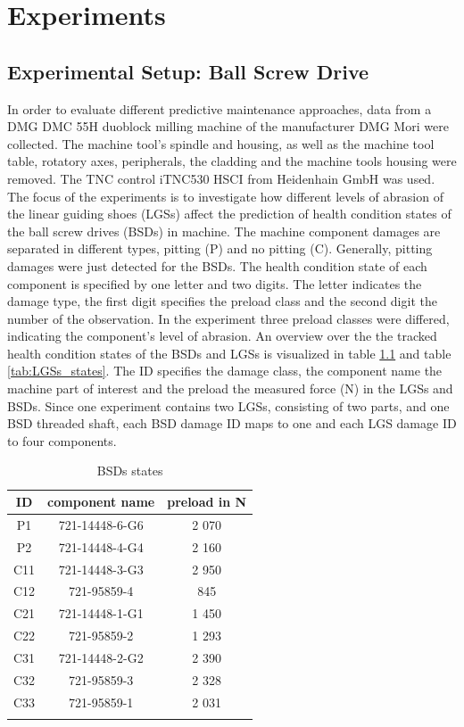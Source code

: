 \chapter{Experiments}\label{chapter:experiments}




\section{Experimental Setup: Ball Screw Drive}
In order to evaluate different predictive maintenance approaches, data from a DMG DMC 55H duoblock milling machine of the manufacturer DMG Mori were collected. The machine tool’s spindle and housing, as well as the machine tool table, rotatory axes, peripherals, the cladding and the machine tools housing were removed. The TNC control iTNC530 HSCI from Heidenhain GmbH was used. The focus of the experiments is to investigate how different levels of abrasion of the linear guiding shoes (LGSs) affect the prediction of health condition states of the ball screw drives (BSDs) in machine. The machine component damages are separated in different types, pitting (P) and no pitting (C). Generally, pitting damages were just detected for the BSDs. The health condition state of each component is specified by one letter and two digits. The letter indicates the damage type, the first digit specifies the preload class and the second digit the number of the observation. In the experiment three preload classes were differed, indicating the component's level of abrasion. An overview over the the tracked health condition states of the BSDs and LGSs is visualized in table \ref {tab:BSDs_states} and table \ref {tab:LGSs_states}. The ID specifies the damage class, the component name the machine part of interest and the preload the measured force (N) in the LGSs and BSDs. Since one experiment contains two LGSs, consisting of two parts, and one BSD threaded shaft, each BSD damage ID maps to one and each LGS damage ID to four components. 


\begin{center}
\begin{longtable}{||c c c||} 
 \hline
 ID & component name & preload in N \\ [0.5ex] 
 \hline
 P1 & 721-14448-6-G6 & 2 070 \\ 
 P2 & 721-14448-4-G4 & 2 160 \\ 
 C11 & 721-14448-3-G3 & 2 950 \\ 
 C12 & 721-95859-4 & 845 \\ 
 C21  & 721-14448-1-G1 & 1 450 \\ [1ex] 
 C22  & 721-95859-2 & 1 293 \\ [1ex] 
 C31  & 721-14448-2-G2 & 2 390 \\ [1ex] 
 C32  & 721-95859-3 & 2 328 \\ [1ex] 
 C33 & 721-95859-1 & 2 031 \\ [1ex]
   \hline
\caption {BSDs states}
\label {tab:BSDs_states}
\end{longtable}
\end{center}


